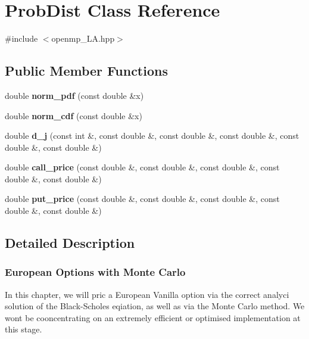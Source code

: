 \hypertarget{classProbDist}{}\section{Prob\+Dist Class Reference}
\label{classProbDist}


{\ttfamily \#include $<$openmp\+\_\+\+L\+A.\+hpp$>$}

\subsection*{Public Member Functions}
\begin{DoxyCompactItemize}
\item 
\mbox{\label{classProbDist_a13d09e11095574b1ad9f13fc2c465ba3}} 
double {\bfseries norm\+\_\+pdf} (const double \&x)
\item 
\mbox{\label{classProbDist_a36682e031a24ad12a12fc862d7255907}} 
double {\bfseries norm\+\_\+cdf} (const double \&x)
\item 
\mbox{\label{classProbDist_ace4aaaa131e238b5580b0c0997c1eb91}} 
double {\bfseries d\+\_\+j} (const int \&, const double \&, const double \&, const double \&, const double \&, const double \&)
\item 
\mbox{\label{classProbDist_a429dbe8c4d259e8432af9e277f04f824}} 
double {\bfseries call\+\_\+price} (const double \&, const double \&, const double \&, const double \&, const double \&)
\item 
\mbox{\label{classProbDist_aff1e433c9e4bc7b14c44dd06f070ee80}} 
double {\bfseries put\+\_\+price} (const double \&, const double \&, const double \&, const double \&, const double \&)
\end{DoxyCompactItemize}


\subsection{Detailed Description}
\subsubsection*{European Options with Monte Carlo }

In this chapter, we will pric a European Vanilla option via the correct analyci solution of the Black-\/\+Scholes eqiation, as well as via the Monte Carlo method. We won\textquotesingle{}t be cooncentrating on an extremely efficient or optimised implementation at this stage.

